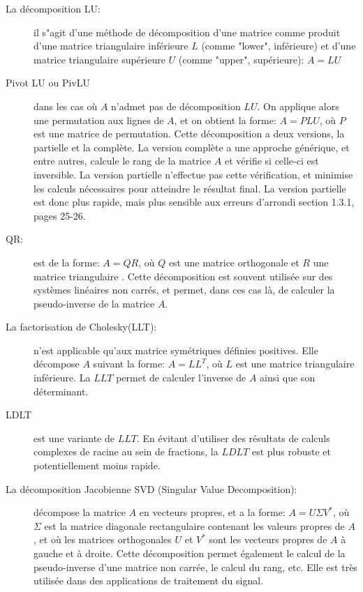 \documentclass{report}
\begin{document}
\begin{description}
\item[La décomposition LU:] il s"agit d'une méthode de décomposition d'une matrice comme produit d'une matrice triangulaire inférieure $L$ (comme "lower", inférieure) et d'une matrice triangulaire supérieure $U$ (comme "upper", supérieure): $A=LU$ \cite{bib_decompositionLUwikipedia} \cite{bib_decompositionLU_2}
\item[Pivot LU ou PivLU] dans les cas où $A$ n'admet pas de décomposition $LU$. On applique alors une permutation aux lignes de $A$, et on obtient la forme: $A=PLU$, où $P$ est une matrice de permutation. Cette décomposition a deux versions, la partielle et la complète. La version complète a une approche générique, et entre autres, calcule le rang de la matrice $A$ et vérifie si celle-ci est inversible. La version partielle n'effectue pas cette vérification, et minimise les calculs nécessaires pour atteindre le résultat final. La version partielle est donc plus rapide, mais plus sensible aux erreurs d'arrondi \cite{bib_decompositionLU_1} section 1.3.1, pages 25-26.
\item[QR:] est de la forme: $A=Q R$, où $Q$ est une matrice orthogonale et $R$ une matrice triangulaire \cite{bib_decompositionQRwikipedia}. Cette décomposition est souvent utilisée sur des systèmes linéaires non carrés, et permet, dans ces cas là, de calculer la pseudo-inverse de la matrice $A$.
\item[La factorisation de Cholesky(LLT):] n'est applicable qu'aux matrice symétriques définies positives. Elle décompose $A$ suivant la forme: $A = L L^T$, où $L$ est une matrice triangulaire inférieure. La $LLT$ permet de calculer l'inverse de $A$ ainsi que son déterminant.
\item[LDLT] est une variante de $LLT$. En évitant d'utiliser des résultats de calculs complexes de racine au sein de fractions, la $LDLT$ est plus robuste et potentiellement moins rapide.
\item[La décomposition Jacobienne SVD (Singular Value Decomposition):] décompose la matrice $A$ en vecteurs propres, et a la forme: $A = U \Sigma V^\ast$, où $\Sigma$ est la matrice diagonale rectangulaire contenant les valeurs propres de $A$, et où les matrices orthogonales $U$ et $V^\ast$ sont les vecteurs propres de $A$ à gauche et à droite. Cette décomposition permet également le calcul de la pseudo-inverse d'une matrice non carrée, le calcul du rang, etc. Elle est très utilisée dans des applications de traitement du signal. 
\end{description}
\end{document}

